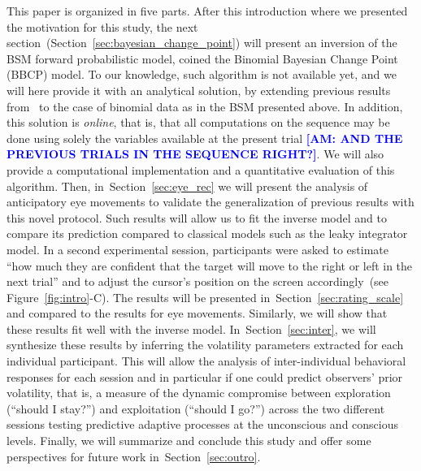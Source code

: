 \documentclass[12pt,english]{article}%
\newcommand{\citet}[1]{\textcite{#1}}
\newcommand{\seeFig}[1]{Figure~\ref{fig:#1}}
\newcommand{\seeSec}[1]{Section~\ref{sec:#1}}
\newcommand{\AM}[1]{\textbf{\textcolor{blue}{[AM: #1]}}}
\begin{document}
This paper is organized in five parts.
After this introduction where we presented the motivation for this study,
the next section~(\seeSec{bayesian_change_point}) will present
an inversion of the BSM forward probabilistic model,
coined the Binomial Bayesian Change Point (BBCP) model.
To our knowledge, such algorithm is not available yet, and
we will here provide it with an analytical solution,
by extending previous results from~\citet{AdamsMackay2007}
to the case of binomial data as in the BSM presented above.
In addition, this solution is \emph{online},
that is, that all computations on the sequence may be done
using solely the variables available at the present trial \AM{AND THE PREVIOUS TRIALS IN THE SEQUENCE RIGHT?}.
We will also provide a computational implementation
and a quantitative evaluation of this algorithm.
Then, in~\seeSec{eye_rec} we will present  the analysis of anticipatory eye movements
to validate the generalization of previous results %
with this novel protocol. %
Such results will allow us to fit the inverse model and to compare
its prediction compared to classical models such as the leaky integrator model.
In a second experimental session, participants were asked to estimate
``how much they are confident that
the target will move to the right or left in the next trial'' and
to adjust the cursor's position on the screen accordingly~(see \seeFig{intro}-C).
The results will be presented in~\seeSec{rating_scale}
and compared to the results for eye movements.
Similarly, we will show that these results fit well
with the inverse model.
In~\seeSec{inter}, we will synthesize these results
by inferring the volatility parameters extracted
for each individual participant. %
This will allow the analysis of inter-individual behavioral responses for each session
and in particular if one could predict observers' prior volatility,
that is, a measure of the dynamic compromise between exploration (``should I stay?'')
and exploitation (``should I go?'')
across the two different sessions testing predictive adaptive processes
at the unconscious and conscious levels.
Finally, we will summarize and conclude this study and
offer some perspectives for future work in~\seeSec{outro}.
\end{document}
